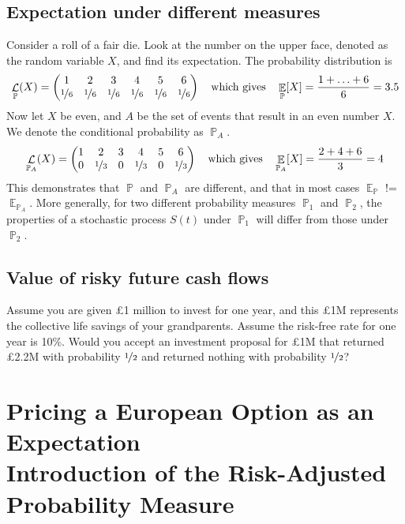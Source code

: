 \documentclass[11pt]{article}
\theoremstyle{definition}
\theoremstyle{remark}
\DeclareMathOperator{\Exp}{\mathbb{E}}
\DeclareMathOperator{\Prob}{\mathbb{P}}
\DeclareMathOperator{\Distrib}{\mathcal{L}}
\begin{document}
\subsection{Expectation under different measures}
Consider a roll of a fair die. Look at the number on the upper face, denoted as the random variable $X$, and find its expectation. The probability distribution is
$$\Distrib_{\Prob}(X) = \begin{pmatrix}
1 & 2 & 3 & 4 & 5 & 6 \\
\nicefrac{1}{6} & \nicefrac{1}{6} & \nicefrac{1}{6} & \nicefrac{1}{6} & \nicefrac{1}{6} & \nicefrac{1}{6} 
\end{pmatrix} 
\quad \text{which gives} \quad 
\Exp_{\Prob}[X] = \frac{1 + \ldots + 6}{6} = 3.5$$
Now let $X$ be even, and $A$ be the set of events that result in an even number $X$. We denote the conditional probability as $\Prob_A$.
$$\Distrib_{\Prob_A}(X) = \begin{pmatrix}
1 & 2 & 3 & 4 & 5 & 6 \\
0 & \nicefrac{1}{3} & 0 & \nicefrac{1}{3} & 0 & \nicefrac{1}{3}\end{pmatrix} 
\quad \text{which gives} \quad 
\Exp_{\Prob_A}[X] = \frac{2 + 4 + 6}{3} = 4$$
This demonstrates that $\Prob$ and $\Prob_A$ are different, and that in most cases $\Exp_{\Prob}$ != $\Exp_{\Prob_A}$. More generally, for two different probability measures $\Prob_1$ and $\Prob_2$, the properties of a stochastic process $S(t)$ under $\Prob_1$ will differ from those under $\Prob_2$.

\subsection{Value of risky future cash flows}
Assume you are given \pounds1 million to invest for one year, and this \pounds1M represents the collective life savings of your grandparents. Assume the risk-free rate for one year is 10\%. Would you accept an investment proposal for \pounds1M that returned \pounds2.2M with probability $\nicefrac{1}{2}$ and returned nothing with probability $\nicefrac{1}{2}$?

\section{Pricing a European Option as an Expectation\\Introduction of the Risk-Adjusted Probability Measure}
\end{document}
